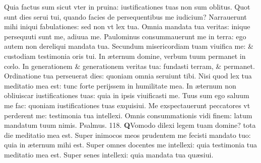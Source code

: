 \documentclass[a5paper,10pt]{book}
\def\ae{æ}
\def\oe{œ}
\begin{document}
\begin{multicols*}{2}
\newline \color{red} Q\color{black}uia factus sum sicut vter in pruina: iustificationes tuas non sum oblitus.
\newline \color{red} Q\color{black}uot sunt dies serui tui, quando facies de persequentibus me iudicium?
\newline \color{red} N\color{black}arrauerunt mihi iniqui fabulationes: sed non vt lex tua.
\newline \color{red} O\color{black}mnia mandata tua veritas: inique persequuti sunt me, adiuua me.
\newline \color{red} P\color{black}aulominus consummauerunt me in terra: ego autem non dereliqui mandata tua.
\newline \color{red} S\color{black}ecundum misericordiam tuam viuifica me: \& custodiam testimonia oris tui.
\newline \color{red} I\color{black}n \ae ternum domine, verbum tuum permanet in c\oe lo.
\newline \color{red} I\color{black}n generationem \& generationem veritas tua: fundasti terram, \& permanet.
\newline \color{red} O\color{black}rdinatione tua perseuerat dies: quoniam omnia seruiunt tibi.
\newline \color{red} N\color{black}isi quod lex tua meditatio mea est: tunc forte perijssem in humilitate mea.
\newline \color{red} I\color{black}n \ae ternum non obliuiscar iustificationes tuas: quia in ipsis viuificasti me.
\newline \color{red} T\color{black}uus sum ego saluum me fac: quoniam iustificationes tuas exquisiui.
\newline \color{red} M\color{black}e exspectauerunt peccatores vt perderent me: testimonia tua intellexi.
\newline \color{red} O\color{black}mnis consummationis vidi finem: latum mandatum tuum nimis. \quad \color{red} Psalmus. \hypertarget{ps118.7}{118.} \color{black}
\vspace{-.5em}
\lettrine[lines=2]{\bfseries \color{red} Q}{}Vomodo dilexi legem tuam domine? tota die meditatio mea est.
\newline \color{red} S\color{black}uper inimocos meos prudentem me fecisti mandato tuo: quia in \ae ternum mihi est.
\newline \color{red} S\color{black}uper omnes docentes me intellexi: quia testimonia tua meditatio mea est.
\newline \color{red} S\color{black}uper senes intellexi: quia mandata tua qu\ae siui.

\end{multicols*}
\end{document}
